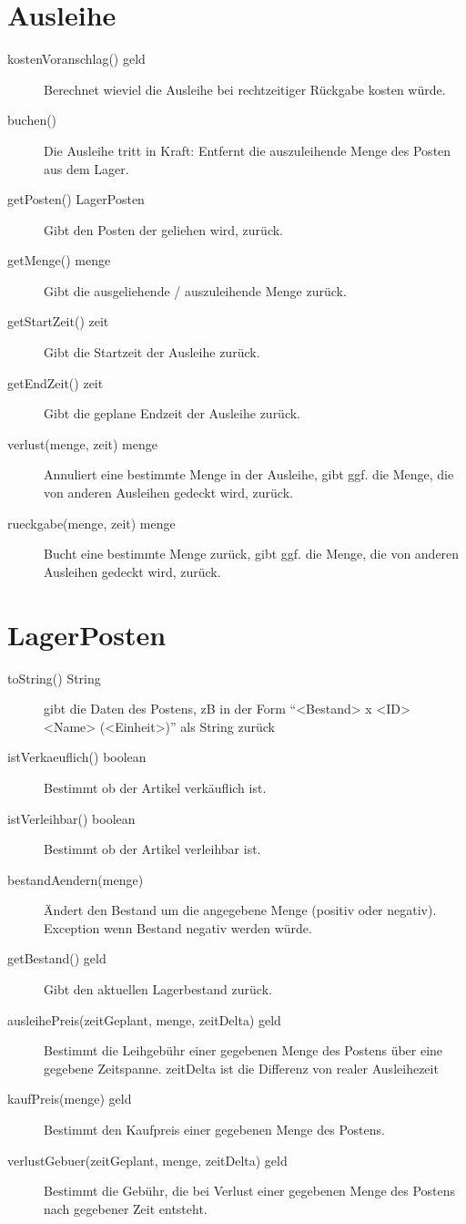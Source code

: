 \documentclass[a4paper,12pt,titlepage]{article}
\begin{document}
\section{Ausleihe}
\begin{description}
\item[kostenVoranschlag() \rightarrow geld]
Berechnet wieviel die Ausleihe bei rechtzeitiger Rückgabe kosten würde.
\item[buchen()]
Die Ausleihe tritt in Kraft: Entfernt die auszuleihende Menge des Posten aus dem Lager.
\item[getPosten() \rightarrow LagerPosten]
Gibt den Posten der geliehen wird, zurück.
\item[getMenge() \rightarrow menge]
Gibt die ausgeliehende / auszuleihende Menge zurück.
\item[getStartZeit() \rightarrow zeit]
Gibt die Startzeit der Ausleihe zurück.
\item[getEndZeit() \rightarrow zeit]
Gibt die geplane Endzeit der Ausleihe zurück.
\item[verlust(menge, zeit) \rightarrow menge]
Annuliert eine bestimmte Menge in der Ausleihe, gibt ggf. die Menge, die von anderen Ausleihen gedeckt wird, zurück.
\item[rueckgabe(menge, zeit) \rightarrow menge]
Bucht eine bestimmte Menge zurück, gibt ggf. die Menge, die von anderen Ausleihen gedeckt wird, zurück.
\end{description}
\section{LagerPosten}
\begin{description}
\item[toString() \rightarrow String]
gibt die Daten des Postens, zB in der Form \enquote{<Bestand> x <ID> <Name> (<Einheit>)} als String zurück
\item[istVerkaeuflich() \rightarrow boolean]
Bestimmt ob der Artikel verkäuflich ist.
\item[istVerleihbar() \rightarrow boolean]
Bestimmt ob der Artikel verleihbar ist.
\item[bestandAendern(menge)]
Ändert den Bestand um die angegebene Menge (positiv oder negativ). \\
Exception wenn Bestand negativ werden würde.
\item[getBestand() \rightarrow geld]
Gibt den aktuellen Lagerbestand zurück.
\item[ausleihePreis(zeitGeplant, menge, zeitDelta) \rightarrow geld]
Bestimmt die Leihgebühr einer gegebenen Menge des Postens über eine gegebene Zeitspanne.
zeitDelta ist die Differenz von realer Ausleihezeit 
\item[kaufPreis(menge) \rightarrow geld]
Bestimmt den Kaufpreis einer gegebenen Menge des Postens.
\item[verlustGebuer(zeitGeplant, menge, zeitDelta) \rightarrow geld]
Bestimmt die Gebühr, die bei Verlust einer gegebenen Menge des Postens nach gegebener Zeit entsteht.
\end{description}
\end{document}
